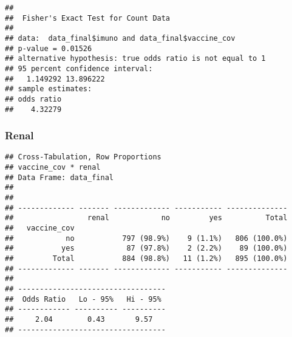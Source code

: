 \documentclass[
]{article}
\newenvironment{Shaded}{\begin{snugshade}}{\end{snugshade}}
\newcommand{\AttributeTok}[1]{\textcolor[rgb]{0.77,0.63,0.00}{#1}}
\newcommand{\ConstantTok}[1]{\textcolor[rgb]{0.00,0.00,0.00}{#1}}
\newcommand{\FunctionTok}[1]{\textcolor[rgb]{0.00,0.00,0.00}{#1}}
\newcommand{\NormalTok}[1]{#1}
\newcommand{\SpecialCharTok}[1]{\textcolor[rgb]{0.00,0.00,0.00}{#1}}
\newcommand{\StringTok}[1]{\textcolor[rgb]{0.31,0.60,0.02}{#1}}
\begin{document}
\begin{Shaded}
\end{Shaded}

\begin{verbatim}
## 
##  Fisher's Exact Test for Count Data
## 
## data:  data_final$imuno and data_final$vaccine_cov
## p-value = 0.01526
## alternative hypothesis: true odds ratio is not equal to 1
## 95 percent confidence interval:
##   1.149292 13.896222
## sample estimates:
## odds ratio 
##    4.32279
\end{verbatim}

\hypertarget{renal}{%
\subsubsection{Renal}\label{renal}}

\begin{Shaded}
\end{Shaded}

\begin{verbatim}
## Cross-Tabulation, Row Proportions  
## vaccine_cov * renal  
## Data Frame: data_final  
## 
## 
## ------------- ------- ------------- ----------- --------------
##                 renal            no         yes          Total
##   vaccine_cov                                                 
##            no           797 (98.9%)    9 (1.1%)   806 (100.0%)
##           yes            87 (97.8%)    2 (2.2%)    89 (100.0%)
##         Total           884 (98.8%)   11 (1.2%)   895 (100.0%)
## ------------- ------- ------------- ----------- --------------
## 
## ----------------------------------
##  Odds Ratio   Lo - 95%   Hi - 95% 
## ------------ ---------- ----------
##     2.04        0.43       9.57   
## ----------------------------------
\end{verbatim}
\end{document}
